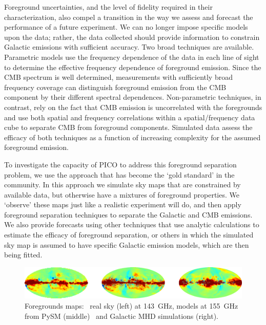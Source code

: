 \documentclass[PICOReport.tex]{subfiles}
\begin{document}

Foreground uncertainties, and the level of fidelity required in their characterization, also compel a transition in the way we assess and forecast the performance of a future experiment. We can no longer impose specific models upon the data; rather, the data collected should provide information to constrain Galactic emissions with sufficient accuracy.  Two broad techniques are available.  Parametric models use the frequency dependence of the data in each line of sight to determine the effective frequency dependence of foreground emission.  Since the CMB spectrum is well determined, measurements with sufficiently broad frequency coverage can distinguish foreground emission from the CMB component by their different spectral dependences.  Non-parametric techniques, in contrast, rely on the fact that CMB emission is uncorrelated with the foregrounds and use both spatial and frequency correlations within a spatial/frequency data cube to separate CMB from foreground components.  Simulated data assess the efficacy of both techniques as a function of increasing complexity for the assumed foreground emission.

To investigate the capacity of PICO to address this foreground separation problem, we use the approach that has become the `gold standard' in the community. In this approach we simulate sky maps that are constrained by available data, but otherwise have a mixtures of foreground properties. We  `observe' these maps just like a realistic experiment will do, and then apply foreground separation techniques to separate the Galactic and CMB emissions. We also provide forecasts using other techniques that use analytic calculations to estimate the efficacy of foreground separation, or others in which the simulated sky map is assumed to have specific Galactic emission models, which are then being fitted. 
\begin{figure}[t]
\begin{center}
\includegraphics[width=.95\textwidth]{images/foregrounds_maps_planck_models}
\vspace{-0.1in}
\caption{\captiontext
Foregrounds maps: \planck~real sky (left) at 143~GHz, models at 155~GHz from PySM (middle)~\citep{thorne2018_pysm} and Galactic MHD simulations (right). }
\label{fig:pysm_foregrounds}
\end{center}
\vspace{-0.2in}
\end{figure}
\end{document}
